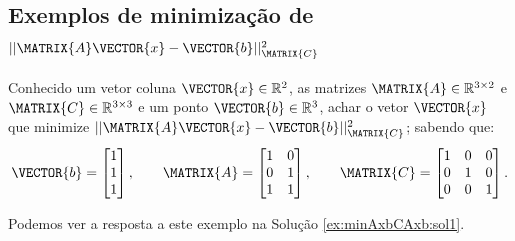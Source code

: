 \subsection{Exemplos de minimização de $||\MATRIX{A}\VECTOR{x}-\VECTOR{b}||_{\MATRIX{C}}^2$}

\begin{example}
\label{ex:minAxbCAxb1}
Conhecido 
um vetor coluna $\VECTOR{x}\in \mathbb{R}^2$,
as matrizes $\MATRIX{A} \in \mathbb{R}^{3\times 2}$ e $\MATRIX{C} \in \mathbb{R}^{3\times 3}$
e um ponto $\VECTOR{b} \in \mathbb{R}^{3}$,
achar o vetor $\VECTOR{x}$ que minimize $||\MATRIX{A}\VECTOR{x}-\VECTOR{b}||_{\MATRIX{C}}^2$;
sabendo que:
\begin{equation}
\VECTOR{b}=\begin{bmatrix}
1\\
1\\
1
\end{bmatrix},
\qquad 
\MATRIX{A}=\begin{bmatrix}
1 & 0\\
0 & 1\\
1 & 1
\end{bmatrix},
\qquad 
\MATRIX{C}=\begin{bmatrix}
1 & 0 & 0\\
0 & 1 & 0\\
0 & 0 & 1
\end{bmatrix}.
\end{equation}

Podemos ver a resposta a este exemplo na Solução \ref{ex:minAxbCAxb:sol1}.
\end{example}


